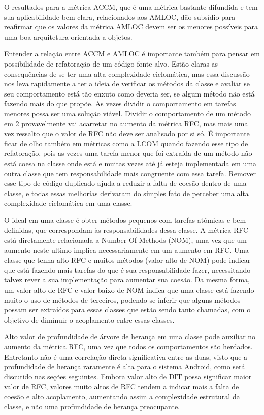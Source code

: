 O resultados para a métrica ACCM, que é uma métrica bastante difundida e tem sua aplicabilidade bem clara, relacionados aos AMLOC, dão subsídio para reafirmar que os valores da métrica AMLOC devem ser os menores possíveis para uma boa arquitetura orientada a objetos.

Entender a relação entre ACCM e AMLOC é importante também para pensar em possibilidade de refatoração de um código fonte alvo. Estão claras as consequências de se ter uma alta complexidade ciclomática, mas essa discussão nos leva rapidamente a ter a ideia de verificar os métodos da classe e avaliar se seu comportamento está tão enxuto como deveria ser, se algum método não está fazendo mais do que propõe. As vezes dividir o comportamento em tarefas menores possa ser uma solução viável. Dividir o comportamento de um método em 2 provavelmente vai acarretar no aumento da métrica RFC, mas mais uma vez ressalto que o valor de RFC não deve ser analisado por si só. É importante ficar de olho também em métricas como a LCOM quando fazendo esse tipo de refatoração, pois as vezes uma tarefa menor que foi extraída de um método não está coesa na classe onde está e muitas vezes até já esteja implementada em uma outra classe que tem responsabilidade mais congruente com essa tarefa. Remover esse tipo de código duplicado ajuda a reduzir a falta de coesão dentro de uma classe, e todas essas melhorias derivaram do simples fato de perceber uma alta complexidade ciclomática em uma classe.

O ideal em uma classe é obter métodos pequenos com tarefas atômicas e bem definidas, que correspondam às responsabilidades dessa classe. A métrica RFC está diretamente relacionada a Number Of Methods (NOM), uma vez que um aumento neste ultimo implica necessariamente em um aumento em RFC. Uma classe que tenha alto RFC e muitos métodos (valor alto de NOM) pode indicar que está fazendo mais tarefas do que é sua responsabilidade fazer, necessitando talvez rever a sua implementação para aumentar sua coesão. Da mesma forma, um valor alto de RFC e valor baixo de NOM indica que uma classe está fazendo muito o uso de métodos de terceiros, podendo-se inferir que alguns métodos possam ser extraídos para essas classes que estão sendo tanto chamadas, com o objetivo de diminuir o acoplamento entre essas classes.

Alto valor de profundidade de árvore de herança em uma classe pode auxiliar no aumento da métrica RFC, uma vez que todos os comportamentos são herdados. Entretanto não é uma correlação direta significativa entre as duas, visto que a profundidade de herança raramente é alta para o sistema Android, como será discutido nas seções seguintes. Embora valor alto de DIT possa significar maior valor de RFC, valores muito altos de RFC tendem a indicar mais a falta de coesão e alto acoplamento, aumentando assim a complexidade estrutural da classe, e não uma profundidade de herança preocupante.

